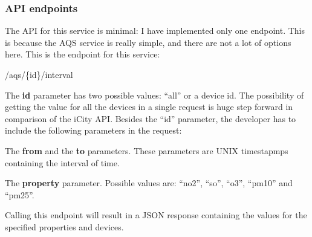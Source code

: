 \subsubsection*{\ac{API} endpoints}

The \ac{API} for this service is minimal: I have implemented only one endpoint.
This is because the \ac{AQS} service is really simple, and there are not a lot
of options here. This is the endpoint for this service:

\begin{center}
  /aqs/\{id\}/interval
\end{center}

The {\bf id} parameter has two possible values: ``all'' or a device id. The
possibility of getting the value for all the devices in a single request is
huge step forward in comparison of the iCity \ac{API}. Besides the ``id''
parameter, the developer has to include the following parameters in the request:

\mylist
  \item The {\bf from} and the {\bf to} parameters. These parameters are UNIX
timestapmps containing the interval of time.
  \item The {\bf property} parameter. Possible values are: ``no2'', ``so'',
``o3'', ``pm10'' and ``pm25''.
\mylistend

Calling this endpoint will result in a JSON response containing the values for
the specified properties and devices.
